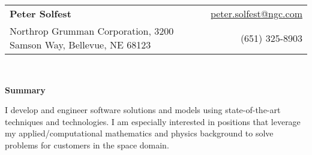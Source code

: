 \documentclass[letterpaper,11pt]{article}
\makeatletter
\newcommand{\resheading}[1]{{\large \textbf{#1}}}
\newcommand{\email}{\href{mailto:peter.solfest@ngc.com}{peter.solfest@ngc.com}}
\newcommand{\address}{{\footnotesize Northrop Grumman Corporation, 3200 Samson Way, Bellevue, NE 68123}}
\newcommand{\phone}{(651) 325-8903}
\makeatother
\begin{document}
\newcommand{\mywebheader}{
\begin{tabular*}{7in}{l@{\extracolsep{\fill}}r}
  \textbf{\LARGE Peter Solfest} & \email \\
    \address & \phone  %
\end{tabular*}
\\
\vspace{0.1in}}

\mywebheader

\resheading{Summary}

  I develop and engineer software solutions and models using state-of-the-art techniques and technologies.
  I am especially interested in positions that leverage my applied/computational mathematics and physics
   background to solve problems for customers in the space domain.

  \vspace{0.1in}
\end{document}
